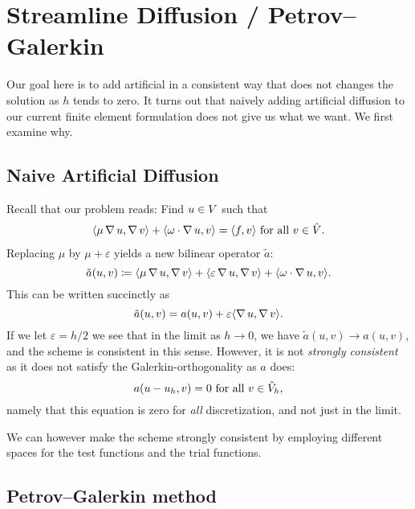 \section{Streamline Diffusion / Petrov--Galerkin}
\label{sec:streamline_diffusion_petrov_galerkin}

Our goal here is to add artificial in a consistent way that does not changes
the solution as \( h \) tends to zero. It turns out that naively adding
artificial diffusion to our current finite element formulation does not give us
what we want. We first examine why. 

\subsection{Naive Artificial Diffusion}
\label{sub:naive_artificial_diffusion}

Recall that our problem reads: Find \( u \in V\) such that
\begin{align}
    \langle \mu \operatorname{\mathop{}\!\nabla} u, \operatorname{\mathop{}\!\nabla} v \rangle + \langle \omega \cdot \operatorname{\mathop{}\!\nabla} u, v
    \rangle = \langle f, v \rangle \text{ for all } v \in \hat{V}.
\end{align}
Replacing \( \mu \) by \( \mu + \varepsilon \) yields a new bilinear operator \( \tilde{a} \):
\begin{equation}
    \tilde{a}(u, v) \coloneqq \langle \mu \operatorname{\mathop{}\!\nabla} u, \operatorname{\mathop{}\!\nabla} v \rangle + \langle
    \varepsilon \operatorname{\mathop{}\!\nabla} u, \operatorname{\mathop{}\!\nabla} v \rangle + \langle \omega \cdot \operatorname{\mathop{}\!\nabla} u, v
\rangle.
\end{equation}
This can be written succinctly as 
\begin{equation}
    \tilde{a}(u, v) = a(u, v) + \varepsilon \langle \operatorname{\mathop{}\!\nabla} u, \operatorname{\mathop{}\!\nabla} v\rangle.
\end{equation}
If we let \( \varepsilon = h / 2 \) we see that in the limit as \( h \to 0 \),
we have \( \tilde{a}(u, v) \to a(u, v) \), and the scheme is consistent in this
sense. However, it is not \emph{strongly consistent} as it does not satisfy
the Galerkin-orthogonality as \( a \) does: 
\begin{equation}
    a(u - u_h, v) = 0 \text{ for all } v \in \hat{V}_h,
\end{equation}
namely that this equation is zero for \emph{all} discretization, and not just
in the limit.

We can however make the scheme strongly consistent by employing different
spaces for the test functions and the trial functions.

\subsection{Petrov--Galerkin method}


